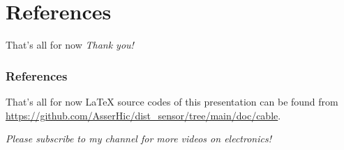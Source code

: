 \documentclass{beamer}
\begin{document}
\logo{} %
\section{References}

\begin{frame}{That's all for now}
\centering \Huge
\emph{Thank you!}
\end{frame}

\begin{frame}[t, allowframebreaks]
\frametitle{References}


\end{frame}

\begin{frame}{That's all for now}
\centering
\LaTeX{} source codes of this presentation can be found from
\url{https://github.com/AsserHic/dist_sensor/tree/main/doc/cable}.
\medskip

\emph{Please subscribe to my channel for more videos on electronics!}
\end{frame}
\end{document}
